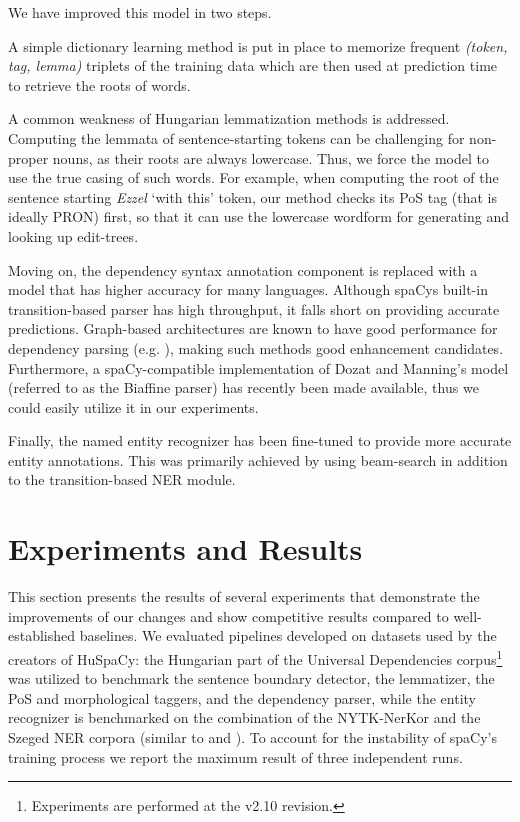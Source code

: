 \documentclass[runningheads,a4paper]{llncs}
\newcommand{\spacy}{spaCy}
\newcommand{\huspacy}{HuSpaCy}
\newcommand{\universaldependencies}{Universal Dependencies}
\newcommand{\nerkor}{NYTK-NerKor}
\newcommand{\szegedner}{Szeged NER}
\newcommand{\biaffine}{Biaffine}
\begin{document}
We have improved this model in two steps. 
\begin{enumerate*}
    \item A simple dictionary learning method is put in place to memorize frequent \textit{(token, tag, lemma)} triplets of the training data which are then used at prediction time to retrieve the roots of words. 
    \item A common weakness of Hungarian lemmatization methods is addressed. Computing the lemmata of sentence-starting tokens can be challenging for non-proper nouns, as their roots are always lowercase. Thus, we force the model to use the true casing of such words. For example, when computing the root of the sentence starting \textit{Ezzel} `with this' token, our method checks its PoS tag (that is ideally PRON) first, so that it can use the lowercase wordform for generating and looking up edit-trees.
\end{enumerate*}

Moving on, the dependency syntax annotation component is replaced with a model that has higher accuracy for many languages. Although \spacy\textquotesingle s built-in transition-based parser \cite{spacy-parser} has high throughput, it falls short on providing accurate predictions. Graph-based architectures are known to have good performance for dependency parsing (e.g. \cite{altintacs2023improving}), making such methods good enhancement candidates. Furthermore, a \spacy-compatible implementation of Dozat and Manning’s model \cite{biaffine} (referred to as the \biaffine{} parser) has recently been made available, thus we could easily utilize it in our experiments.

Finally, the named entity recognizer has been fine-tuned to provide more accurate entity annotations. This was primarily achieved by using beam-search in addition to the transition-based NER module.

\section{Experiments and Results} \label{sec:experiments}

This section presents the results of several experiments that demonstrate the improvements of our changes and show competitive results compared to well-established baselines. We evaluated pipelines developed on datasets used by the creators of \huspacy: the Hungarian part of the \universaldependencies{} corpus\footnote{Experiments are performed at the v2.10 revision.} was utilized to benchmark the sentence boundary detector, the lemmatizer, the PoS and morphological taggers, and the dependency parser, while the entity recognizer is benchmarked on the combination of the \nerkor{} and the \szegedner{} corpora (similar to \cite{huspacy:2021} and \cite{nerkoreval}). To account for the instability of \spacy’s training process we report the maximum result of three independent runs. 
\end{document}
